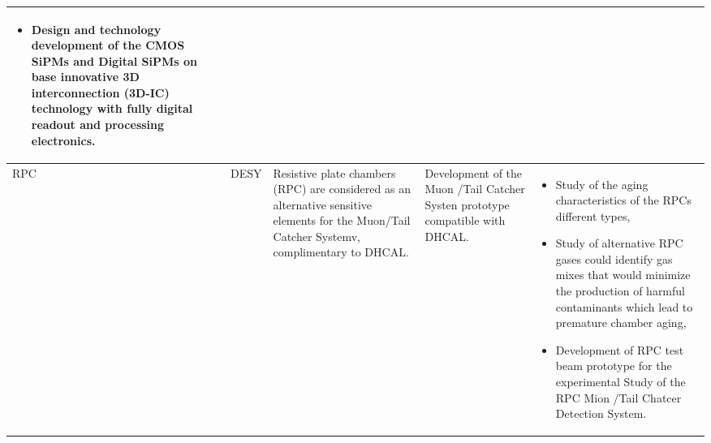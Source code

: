 \begin{landscape}
\begin{adjustbox}{max width=1.1\textwidth,totalheight=1\textheight}
\begin{tabularx}{1.6\textheight}{llXXX}
\begin{itemize}
\item Design and technology development of the CMOS SiPMs and Digital SiPMs on base innovative 3D interconnection (3D-IC) technology with fully digital readout and processing electronics.
\end{itemize}
 \\
    \midrule
        RPC &
        DESY &
        Resistive plate chambers (RPC) are considered as an alternative sensitive elements for the Muon/Tail Catcher Systemv, complimentary to DHCAL.&
        Development of the Muon /Tail Catcher Systen prototype compatible with DHCAL. &
        \begin{itemize}
        \item Study of the aging characteristics of the RPCs different types,
        \item Study of alternative RPC gases could identify gas mixes that would minimize the production of harmful contaminants which lead to premature chamber aging,
        \item Development of RPC test beam prototype for the experimental Study of the RPC Mion /Tail Chatcer Detection System.
        \end{itemize}
        \\
    \bottomrule
\end{tabularx}
\end{adjustbox}
\end{landscape}
\restoregeometry
